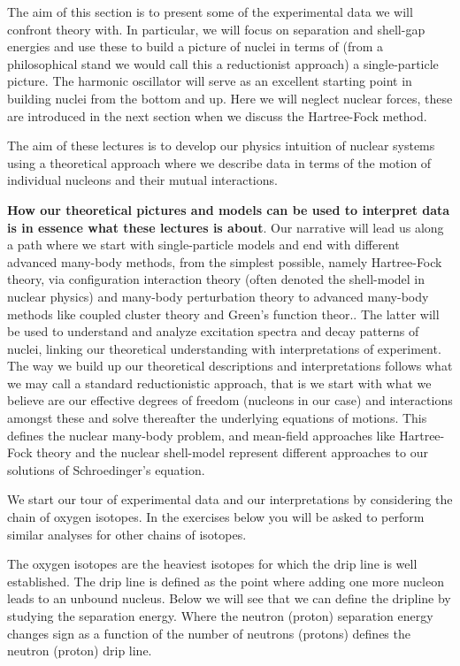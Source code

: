 \documentclass[%
oneside,                 %
final,                   %
10pt]{article}
\begin{document}
The aim of this section is to present some of the experimental data we will confront theory with. In particular, we will focus on separation and shell-gap energies and use these to build a picture of nuclei in terms of (from a philosophical stand we would call this  a reductionist approach) a single-particle picture. The harmonic oscillator will serve as an excellent starting point in building nuclei from the bottom and up. Here we will neglect nuclear forces, these are introduced in the next section when we discuss the Hartree-Fock method. 

The aim of these lectures is to develop our physics intuition of nuclear systems using  a theoretical approach  where we describe data in terms of 
the motion of individual nucleons and their mutual interactions. 

\textbf{How our theoretical pictures and models can be used to interpret data is in essence what these lectures is about}. Our narrative will lead us along a path where we start with single-particle models and end with different advanced many-body methods, from the simplest possible, namely Hartree-Fock theory, via configuration interaction theory (often denoted the shell-model in nuclear physics) and many-body perturbation theory to advanced many-body methods like coupled cluster theory and Green's function theor.. The latter will be used to understand and analyze excitation spectra and decay patterns of nuclei, linking our theoretical understanding with interpretations of experiment. The way we build up our theoretical descriptions and interpretations follows what we may call a standard reductionistic approach, that is we start with what we believe are our effective degrees of freedom (nucleons in our case) and interactions amongst these and solve thereafter the underlying equations of motions. This defines the nuclear many-body problem, and mean-field approaches like Hartree-Fock theory and the nuclear shell-model represent different approaches to our solutions of Schroedinger's equation. 



We start our tour of experimental data and our interpretations by considering the chain of oxygen isotopes. In the exercises below you will be asked to perform similar analyses for other chains of isotopes.

The oxygen isotopes are the heaviest isotopes for which the drip line is well established.  The drip line is defined as the point where adding one more nucleon leads to an unbound nucleus. Below we will see that we can define the dripline by studying the separation energy. Where the neutron (proton) separation energy changes sign as a function of the number of neutrons (protons) defines the neutron (proton) drip line.
\end{document}
